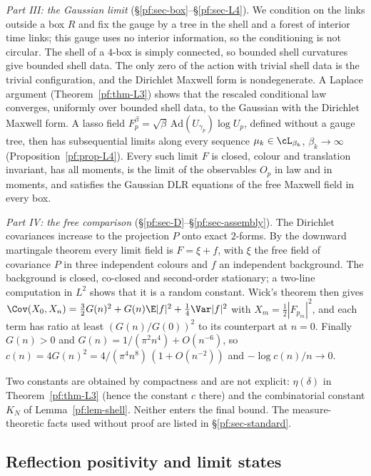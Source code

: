 \emph{Part III: the Gaussian limit} (\S\ref{pf:sec-box}--\S\ref{pf:sec-L4}). We condition on the links outside a box $R$ and fix the gauge by a tree in the shell and a forest of interior time links; this gauge uses no interior information, so the conditioning is not circular. The shell of a $4$-box is simply connected, so bounded shell curvatures give bounded shell data. The only zero of the action with trivial shell data is the trivial configuration, and the Dirichlet Maxwell form is nondegenerate. A Laplace argument (Theorem~\ref{pf:thm-L3}) shows that the rescaled conditional law converges, uniformly over bounded shell data, to the Gaussian with the Dirichlet Maxwell form. A lasso field $F^\beta_p=\sqrt\beta\,\mathrm{Ad}(U_{\gamma_p})\log U_p$, defined without a gauge tree, then has subsequential limits along every sequence $\mu_k\in\cL_{\beta_k}$, $\beta_k\to\infty$ (Proposition~\ref{pf:prop-L4}). Every such limit $F$ is closed, colour and translation invariant, has all moments, is the limit of the observables $O_p$ in law and in moments, and satisfies the Gaussian DLR equations of the free Maxwell field in every box.

\emph{Part IV: the free comparison} (\S\ref{pf:sec-D}--\S\ref{pf:sec-assembly}). The Dirichlet covariances increase to the projection $P$ onto exact $2$-forms. By the downward martingale theorem every limit field is $F=\xi+f$, with $\xi$ the free field of covariance $P$ in three independent colours and $f$ an independent background. The background is closed, co-closed and second-order stationary; a two-line computation in $L^2$ shows that it is a random constant. Wick's theorem then gives
$\Cov(X_0,X_n)=\tfrac32G(n)^2+G(n)\E|f|^2+\tfrac14\Var|f|^2$ with $X_m=\tfrac12|F_{p_m}|^2$, and each term has ratio at least $(G(n)/G(0))^2$ to its counterpart at $n=0$. Finally $G(n)>0$ and $G(n)=1/(\pi^2n^4)+O(n^{-6})$, so $c(n)=4G(n)^2=4/(\pi^4n^8)\,(1+O(n^{-2}))$ and $-\log c(n)/n\to0$.

Two constants are obtained by compactness and are not explicit: $\eta(\delta)$ in Theorem~\ref{pf:thm-L3} (hence the constant $c$ there) and the combinatorial constant $K_N$ of Lemma~\ref{pf:lem-shell}. Neither enters the final bound. The measure-theoretic facts used without proof are listed in \S\ref{pf:sec-standard}.

\subsection{Reflection positivity and limit states}\label{pf:sec-rp}

